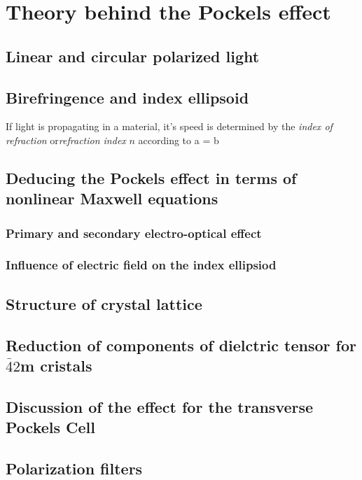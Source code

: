 \section{Theory behind the Pockels effect}

\subsection{Linear and circular polarized light}

\subsection{Birefringence and index ellipsoid}
If light is propagating in a material, it's speed is determined by the 
\emph{index of refraction} or\emph{refraction index} $n$ according to 
\beq
   a = b 
\eeq

\subsection{Deducing the Pockels effect in terms of nonlinear Maxwell equations}
\subsubsection{Primary and secondary electro-optical effect}
\subsubsection{Influence of electric field on the index ellipsiod}

\subsection{Structure of crystal lattice}

\subsection{Reduction of components of dielctric tensor for $\bar{4}2$m cristals}

\subsection{Discussion of the effect for the transverse Pockels Cell}

\subsection{Polarization filters}

